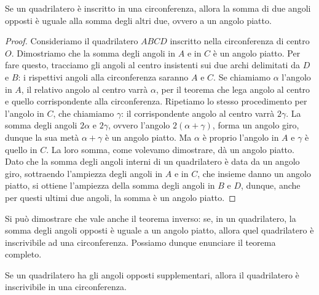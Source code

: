 \begin{teorema}\label{teo:6.5}
Se un quadrilatero è inscritto in una circonferenza, allora la somma di due angoli opposti è uguale alla somma degli altri due, ovvero a un angolo piatto.
\end{teorema}

\begin{figure}[htb]
	\centering
\end{figure}

\begin{proof}
Consideriamo il quadrilatero $ABCD$ inscritto nella circonferenza di centro $O$. Dimostriamo che la somma degli angoli in $A$ e in $C$ è un angolo piatto. Per fare questo, tracciamo gli angoli al centro insistenti sui due archi delimitati da $D$ e $B$: i rispettivi angoli alla circonferenza saranno $A$ e $C$. Se chiamiamo $\alpha$ l'angolo in $A$, il relativo angolo al centro varrà $\alpha$, per il teorema che lega angolo al centro e quello corrispondente alla circonferenza. Ripetiamo lo stesso procedimento per l'angolo in $C$, che chiamiamo $\gamma$: il corrispondente angolo al centro varrà $2\gamma$. La somma degli angoli $2\alpha$ e $2\gamma$, ovvero l'angolo $2(\alpha+\gamma)$, forma un angolo giro, dunque la sua metà $\alpha+\gamma$ è un angolo piatto. Ma $\alpha$ è proprio l'angolo in $A$ e $\gamma$ è quello in $C$. La loro somma, come volevamo dimostrare, dà un angolo piatto. Dato che la somma degli angoli interni di un quadrilatero è data da un angolo giro, sottraendo l'ampiezza degli angoli in $A$ e in $C$, che insieme danno un angolo piatto, si ottiene l'ampiezza della somma degli angoli in $B$ e $D$, dunque, anche per questi ultimi due angoli, la somma è un angolo piatto.
\end{proof}

Si può dimostrare che vale anche il teorema inverso: se, in un quadrilatero, la somma degli angoli opposti è uguale a un angolo piatto, allora quel quadrilatero è inscrivibile ad una circonferenza.
Possiamo dunque enunciare il teorema completo.

\begin{teorema}
Se un quadrilatero ha gli angoli opposti supplementari, allora il quadrilatero è inscrivibile in una circonferenza.
\end{teorema}

\begin{figure}[htb]
	\centering
\end{figure}

